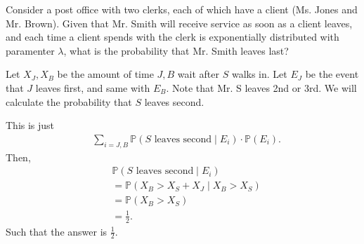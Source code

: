 \begin{eg}
	Consider a post office with two clerks, each of which have a client (Ms. Jones and Mr. Brown). Given that Mr. Smith will receive service as soon as a client leaves, and each time a client spends with the clerk is exponentially distributed with paramenter \( \lambda  \), what is the probability that Mr. Smith leaves last?
\end{eg}
\begin{explanation}
	Let \( X_J, X_B \) be the amount of time \( J, B \) wait after \( S \) walks in. Let \( E_J \) be the event that \( J \) leaves first, and same with \( E_B \). Note that Mr. S leaves 2nd or 3rd. We will calculate the probability that \( S \) leaves second.

	This is just 
	\begin{align*}
		&\sum_{i = J,B} \mathbb{P}(S \text{ leaves second} \mid E_i) \cdot \mathbb{P}(E_i) 
	.\end{align*}
	Then, 
	\begin{align*}
		&\mathbb{P}(S \text{ leaves second} \mid E_i)  \\
		&= \mathbb{P}(X_B > X_S + X_J \mid  X_B > X_S) \\
		&= \mathbb{P}(X_B > X_S) \tag{Memoryless}\\
		&= \frac{1}{2} \tag{Memoryless}
	.\end{align*}
	Such that the answer is \( \frac{1}{2} \).
\end{explanation}

